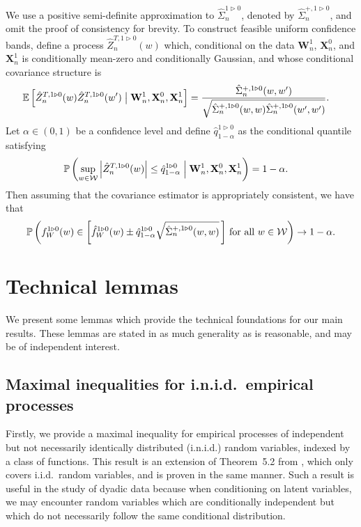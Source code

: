 \documentclass[11pt,lof]{puthesis}
\renewcommand{\P}{\ensuremath{\mathbb{P}}}
\newcommand{\E}{\ensuremath{\mathbb{E}}}
\newcommand{\bW}{\ensuremath{\mathbf{W}}}
\newcommand{\bX}{\ensuremath{\mathbf{X}}}
\newcommand{\cW}{\ensuremath{\mathcal{W}}}
\theoremstyle{break}
\theoremstyle{proof}
\begin{document}
%
We use a positive semi-definite approximation to
$\hat\Sigma_n^{1 \triangleright 0}$, denoted by
$\hat\Sigma_n^{+, 1 \triangleright 0}$,
and omit the proof of consistency for brevity.
To construct feasible uniform confidence bands,
define a process $\hat Z_n^{T, 1 \triangleright 0}(w)$ which,
conditional on the data $\bW_n^1$, $\bX_n^0$, and $\bX_n^1$
is conditionally mean-zero and conditionally Gaussian, and whose
conditional covariance structure is
%
\begin{align*}
\E\left[
\hat Z_n^{T, 1 \triangleright 0}(w)
\hat Z_n^{T, 1 \triangleright 0}(w')
\bigm| \bW_n^1, \bX_n^0, \bX_n^1 \right]
&=
\frac{\hat \Sigma_n^{+, 1 \triangleright 0}(w,w')}
{\sqrt{\hat \Sigma_n^{+, 1 \triangleright 0}(w,w)
\hat \Sigma_n^{+, 1 \triangleright 0}(w',w')}}.
\end{align*}
%
Let $\alpha \in (0,1)$ be a confidence level and define
$\hat q_{1-\alpha}^{1 \triangleright 0}$
as the conditional quantile satisfying
%
\begin{align*}
\P\left(
\sup_{w \in \cW}
\left| \hat Z_n^{T, 1 \triangleright 0}(w) \right|
\leq \hat q_{1-\alpha}^{1 \triangleright 0}
\Bigm\vert \bW_n^1, \bX_n^0, \bX_n^1
\right)
&=
1 - \alpha.
\end{align*}
%
Then assuming that the covariance estimator is appropriately consistent,
we have that
%
\begin{align*}
\P\left(
f_W^{1 \triangleright 0}(w)
\in
\left[
\hat f_W^{1 \triangleright 0}(w)
\pm
\hat q^{1 \triangleright 0}_{1-\alpha}
\sqrt{\hat\Sigma_n^{+, 1 \triangleright 0}(w,w)}
\,\right]
\,\textup{for all }
w \in \cW
\right)
\to 1 - \alpha.
\end{align*}

\section{Technical lemmas}
\label{sec:kernel_app_technical}

We present some lemmas which provide the technical foundations for our main
results. These lemmas are stated in as much generality as is reasonable,
and may be of independent interest.

\subsection{Maximal inequalities for i.n.i.d.\ empirical processes}

Firstly, we provide a maximal inequality
for empirical processes of
independent but not necessarily identically distributed
(i.n.i.d.)
random variables,
indexed by a class of functions.
This result is an extension
of Theorem~5.2 from \citet{chernozhukov2014gaussian},
which only covers i.i.d.\ random variables,
and is proven in the same manner.
Such a result is useful in the study of dyadic data
because when conditioning on latent variables,
we may encounter
random variables which are conditionally independent
but which do not necessarily follow the same
conditional distribution.
\end{document}
